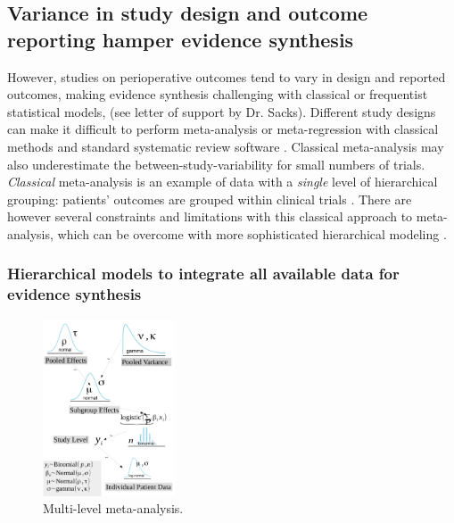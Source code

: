 \documentclass[11pt,notitlepage]{article}
\begin{document}
\subsection*{Variance in study design and outcome reporting hamper evidence synthesis}
However, studies on perioperative outcomes tend to vary in design and reported outcomes\cite{Andreae2013}, making evidence synthesis challenging with classical or frequentist statistical models\cite{Spiegelhalter_11134920}, (see letter of support by Dr. Sacks). Different study designs can make it difficult to perform meta-analysis or meta-regression with classical methods and standard systematic review software \cite{Deeks2011chapter}. Classical meta-analysis may also underestimate the between-study-variability for small numbers of trials\cite{Song2012,Cornell2014,Andreae2015}. \textit{Classical} meta-analysis is an example of data with a \textit{single} level of hierarchical grouping: patients' outcomes are grouped within clinical trials \cite{egger2008systematic}. There are however several constraints and limitations with this classical approach to meta-analysis, which can be overcome with more sophisticated hierarchical modeling  \cite{Andreae2015,Thompson2002,Abroug2011}. 

\subsubsection*{Hierarchical models to integrate all available data for evidence synthesis}

\begin{figure} 
\includegraphics[width=0.35\textwidth]{Figures/DistrogramMultiLevelMetaAnalysis.pdf} 
\caption{Multi-level meta-analysis.}
\label{fig:MetaAnalysis}
\end{figure}
\end{document}
